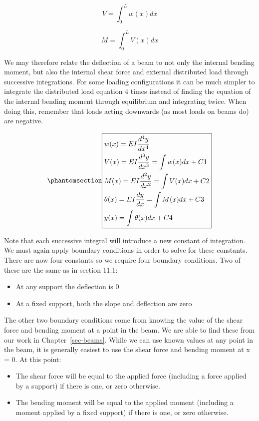 \documentclass[
  letterpaper,
  DIV=11,
  numbers=noendperiod]{scrreprt}
\theoremstyle{definition}
\theoremstyle{remark}
\begin{document}
\[
V=\int_{0}^{L} w(x) d x
\]

\[
M=\int_{0}^{L} V(x) d x
\]

We may therefore relate the deflection of a beam to not only the
internal bending moment, but also the internal shear force and external
distributed load through successive integrations. For some loading
configurations it can be much simpler to integrate the distributed load
equation 4 times instead of finding the equation of the internal bending
moment through equilibrium and integrating twice. When doing this,
remember that loads acting downwards (as most loads on beams do) are
negative.

\begin{equation}\phantomsection\label{eq-11.2}{
\boxed{\begin{aligned}
&w(x)=E I \frac{d^{4} y}{d x^{4}} \\
&V(x)=E I \frac{d^{3} y}{d x^{3}}=\int w(x) d x+C 1 \\
&M(x)=E I \frac{d^{2} y}{d x^{2}}=\int V(x) d x+C 2 \\
&\theta(x)=E I \frac{d y}{d x}=\int M(x) d x+C 3 \\
&y(x)=\int \theta(x) d x+C 4
\end{aligned}}
}\end{equation}

Note that each successive integral will introduce a new constant of
integration. We must again apply boundary conditions in order to solve
for these constants. There are now four constants so we require four
boundary conditions. Two of these are the same as in section 11.1:

\begin{itemize}
\item
  At any support the deflection is 0
\item
  At a fixed support, both the slope and deflection are zero
\end{itemize}

The other two boundary conditions come from knowing the value of the
shear force and bending moment at a point in the beam. We are able to
find these from our work in Chapter~\ref{sec-beams}. While we can use
known values at any point in the beam, it is generally easiest to use
the shear force and bending moment at x = 0. At this point:

\begin{itemize}
\item
  The shear force will be equal to the applied force (including a force
  applied by a support) if there is one, or zero otherwise.
\item
  The bending moment will be equal to the applied moment (including a
  moment applied by a fixed support) if there is one, or zero otherwise.
\end{itemize}
\end{document}
